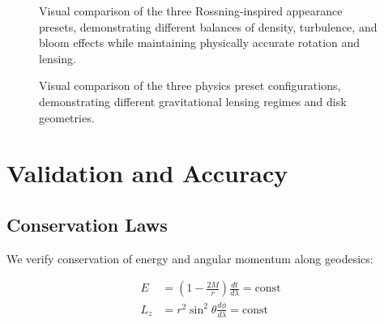 \documentclass[12pt,a4paper]{article}
\theoremstyle{definition}
\theoremstyle{remark}
\begin{document}
\begin{figure}[H]
    \centering
    \caption{Visual comparison of the three Rossning-inspired appearance presets, demonstrating different balances of density, turbulence, and bloom effects while maintaining physically accurate rotation and lensing.}
    \label{fig:rossning_preset_comparison}
\end{figure}

\begin{figure}[H]
    \centering
    \caption{Visual comparison of the three physics preset configurations, demonstrating different gravitational lensing regimes and disk geometries.}
    \label{fig:preset_comparison}
\end{figure}

\section{Validation and Accuracy}

\subsection{Conservation Laws}

We verify conservation of energy and angular momentum along geodesics:

\begin{align}
    E &= \left(1 - \frac{2M}{r}\right)\frac{dt}{d\lambda} = \text{const} \\
    L_z &= r^2\sin^2\theta\frac{d\phi}{d\lambda} = \text{const}
\end{align}
\end{document}
